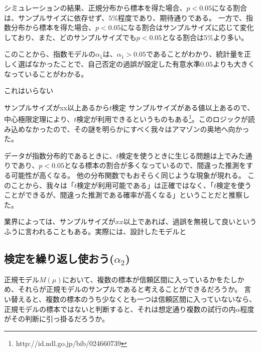 シミュレーションの結果、正規分布から標本を得た場合、$p<0.05$になる割合は、サンプルサイズに依存せず、$5\%$程度であり、期待通りである。
一方で、指数分布から標本を得た場合、$p<0.05$になる割合はサンプルサイズに応じて変化しており、また、どのサンプルサイズでも$p<0.05$となる割合は$5\%$より多い。

このことから、指数モデルの$\alpha_1$は、$\alpha_1>0.05$であることがわかり、統計量を正しく選ばなかったことで、自己否定の過誤が設定した有意水準$0.05$よりも大きくなっていることがわかる。

これはいらない
\begin{SMbox}{サンプルサイズがxx以上あるから$t$検定}
        サンプルサイズがある値以上あるので、中心極限定理により、$t$検定が利用できるというものもある\footnote{http://id.ndl.go.jp/bib/024660739}。このロジックが読み込めなかったので、その謎を明らかにすべく我々はアマゾンの奥地へ向かった。

        データが指数分布的であるときに、$t$検定を使うときに生じる問題は上でみた通りであり、$p<0.05$となる標本の割合が多くなっているので、間違った推測をする可能性が高くなる。
        他の分布関数でもおそらく同じような現象が現れる。
        このことから、我々は「$t$検定が利用可能である」は正確ではなく、「$t$検定を使うことができるが、間違った推測である確率が高くなる」ということだと推察した。

        業界によっては、サンプルサイズが$xx$以上であれば、過誤を無視して良いというふうに言われることもある。実際には、設計したモデルと
\end{SMbox}
\fi

\subsection{検定を繰り返し使おう($\alpha_2$)}
正規モデル$M(\mu)$において、複数の標本が信頼区間に入っているかをたしかめ、それらが正規モデルのサンプルであると考えることができるだろうか。
言い替えると、複数の標本のうち少なくとも一つは信頼区間に入っていないなら、正規モデルの標本ではないと判断すると、それは想定通り複数の試行の内$\alpha$程度がその判断に引っ掛るだろうか。

